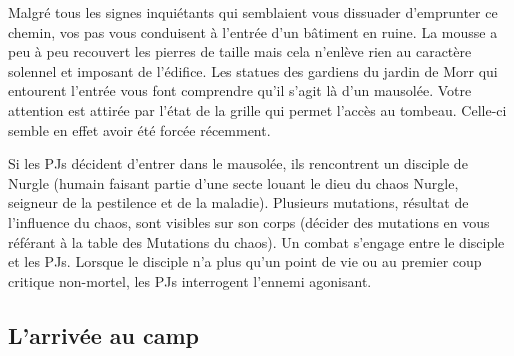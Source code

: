 \documentclass[french,oneside]{wfrp}
\begin{document}
\begin{mjbox}
  Malgré tous les signes inquiétants qui semblaient vous dissuader
  d’emprunter ce chemin, vos pas vous conduisent à l’entrée d’un
  bâtiment en ruine. La mousse a peu à peu recouvert les pierres de
  taille mais cela n’enlève rien au caractère solennel et imposant de
  l’édifice. Les statues des gardiens du jardin de Morr qui entourent
  l’entrée vous font comprendre qu’il s’agit là d’un mausolée. Votre
  attention est attirée par l’état de la grille qui permet l’accès au
  tombeau. Celle-ci semble en effet avoir été forcée récemment.
\end{mjbox}

Si les PJs décident d’entrer dans le mausolée, ils rencontrent un
disciple de Nurgle (humain faisant partie d’une secte louant le dieu
du chaos Nurgle, seigneur de la pestilence et de la
maladie). Plusieurs mutations, résultat de l’influence du chaos, sont
visibles sur son corps (décider des mutations en vous référant à la
table des Mutations du chaos). Un combat s’engage entre le disciple et
les PJs. Lorsque le disciple n’a plus qu’un point de vie ou au premier
coup critique non-mortel, les PJs interrogent l’ennemi agonisant.

\subsection{L'arrivée au camp}
\label{sec:arrivee-au-camp}
\end{document}
